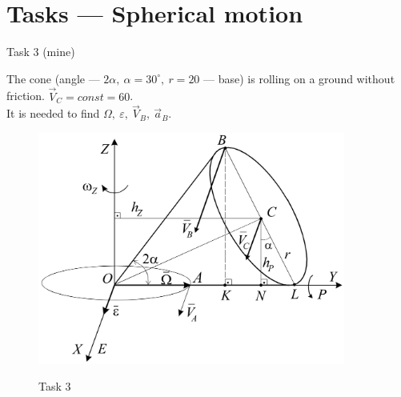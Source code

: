 \documentclass[aspectratio=169]{beamer}
\begin{document}
\section*{Tasks --- Spherical motion}

\begin{frame}[t]{Task 3 (mine)}
    \begin{minipage}{0.42\textwidth}
    The cone (angle --- $2\alpha,\ \alpha = 30^\circ,\ r=20$ --- base) is rolling on a ground without friction. $\vec{V}_C=const=60$.
    \\
    It is needed to find $\Omega,\ \varepsilon,\ \vec{V}_B,\ \vec{a}_B$.
    \end{minipage}
    \begin{minipage}{0.55\textwidth}
            \begin{figure}[H]
        \includegraphics[width=0.9\textwidth]{lab4_task3_filled_fig.png}\\
        \caption*{Task 3}
        \end{figure}
    \end{minipage}
\end{frame}
\end{document}
